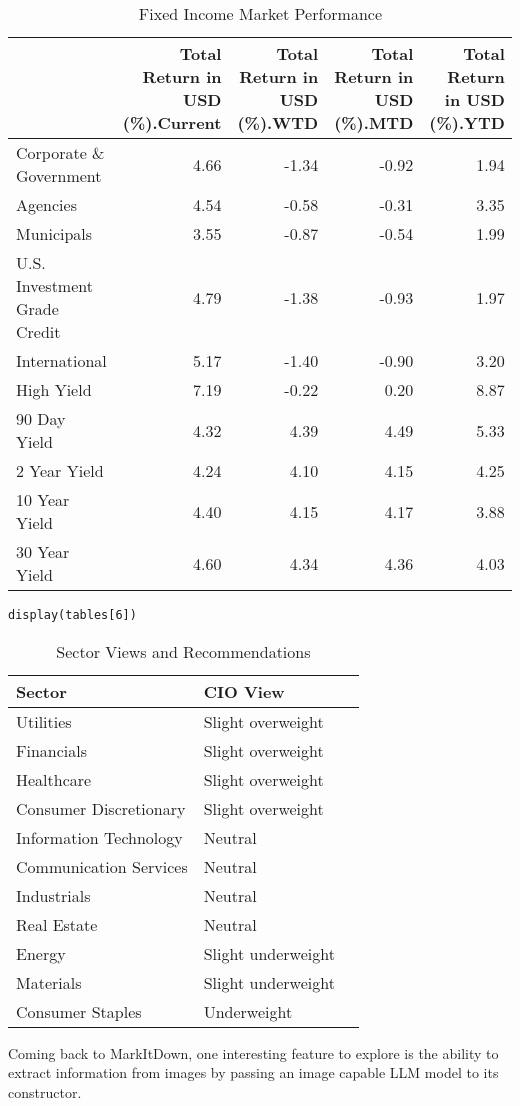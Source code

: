 \begin{table}[htbp]
\centering
\begin{tabular}{lrrrr}
\hline
 & Total Return in USD (\%).Current & Total Return in USD (\%).WTD & Total Return in USD (\%).MTD & Total Return in USD (\%).YTD \\
\hline
Corporate \& Government & 4.66 & -1.34 & -0.92 & 1.94 \\
Agencies & 4.54 & -0.58 & -0.31 & 3.35 \\
Municipals & 3.55 & -0.87 & -0.54 & 1.99 \\
U.S. Investment Grade Credit & 4.79 & -1.38 & -0.93 & 1.97 \\
International & 5.17 & -1.40 & -0.90 & 3.20 \\
High Yield & 7.19 & -0.22 & 0.20 & 8.87 \\
90 Day Yield & 4.32 & 4.39 & 4.49 & 5.33 \\
2 Year Yield & 4.24 & 4.10 & 4.15 & 4.25 \\
10 Year Yield & 4.40 & 4.15 & 4.17 & 3.88 \\
30 Year Yield & 4.60 & 4.34 & 4.36 & 4.03 \\
\hline
\end{tabular}
\caption{Fixed Income Market Performance}
\label{tab:fixed-income-performance}
\end{table}

\begin{verbatim}
display(tables[6])
\end{verbatim}

\begin{table}[htbp]
\centering
\begin{tabular}{lll}
\hline
Sector & CIO View \\
\hline
Utilities & Slight overweight \\
Financials & Slight overweight \\
Healthcare & Slight overweight \\
Consumer Discretionary & Slight overweight \\
Information Technology & Neutral \\
Communication Services & Neutral \\
Industrials & Neutral \\
Real Estate & Neutral \\
Energy & Slight underweight \\
Materials & Slight underweight \\
Consumer Staples & Underweight \\
\hline
\end{tabular}
\caption{Sector Views and Recommendations}
\label{tab:sector-views}
\end{table}
Coming back to MarkItDown, one interesting feature to explore is the ability to extract information from images by passing an image capable LLM model to its constructor.

